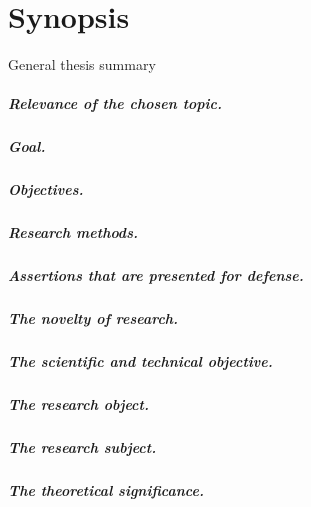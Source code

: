 \renewcommand{\thesubfigure}{\alph{subfigure}}
\renewcommand{\figurename}{Figure}
\renewcommand{\tablename}{Table}
\setcounter{figure}{0}
\setcounter{table}{0}
\setcounter{equation}{0}	%

\chapter*{Synopsis}

\begin{center}
    General thesis summary
\end{center}


\paragraph*{Relevance of the chosen topic.}
\paragraph*{Goal.}
\paragraph*{Objectives.}
\paragraph*{Research methods.}
\paragraph*{Assertions that are presented for defense.}
\paragraph*{The novelty of research.}
\paragraph*{The scientific and technical objective.}
\paragraph*{The research object.}
\paragraph*{The research subject.}
\paragraph*{The theoretical significance.}
